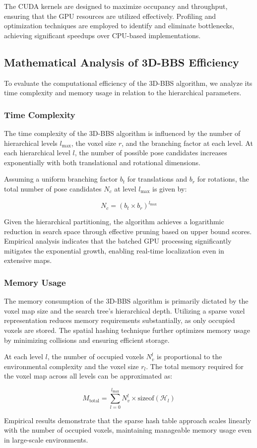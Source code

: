The CUDA kernels are designed to maximize occupancy and throughput, ensuring that the GPU resources are utilized effectively. Profiling and optimization techniques are employed to identify and eliminate bottlenecks, achieving significant speedups over CPU-based implementations.

\subsection{Mathematical Analysis of 3D-BBS Efficiency}
To evaluate the computational efficiency of the 3D-BBS algorithm, we analyze its time complexity and memory usage in relation to the hierarchical parameters.

\subsubsection{Time Complexity}
The time complexity of the 3D-BBS algorithm is influenced by the number of hierarchical levels $l_{\text{max}}$, the voxel size $r$, and the branching factor at each level. At each hierarchical level $l$, the number of possible pose candidates increases exponentially with both translational and rotational dimensions.

Assuming a uniform branching factor $b_t$ for translations and $b_r$ for rotations, the total number of pose candidates $N_c$ at level $l_{\text{max}}$ is given by:

$$N_c = (b_t \times b_r)^{l_{\text{max}}}$$

Given the hierarchical partitioning, the algorithm achieves a logarithmic reduction in search space through effective pruning based on upper bound scores. Empirical analysis indicates that the batched GPU processing significantly mitigates the exponential growth, enabling real-time localization even in extensive maps.

\subsubsection{Memory Usage}
The memory consumption of the 3D-BBS algorithm is primarily dictated by the voxel map size and the search tree's hierarchical depth. Utilizing a sparse voxel representation reduces memory requirements substantially, as only occupied voxels are stored. The spatial hashing technique further optimizes memory usage by minimizing collisions and ensuring efficient storage.

At each level $l$, the number of occupied voxels $N_v^l$ is proportional to the environmental complexity and the voxel size $r_l$. The total memory required for the voxel map across all levels can be approximated as:

$$M_{\text{total}} = \sum_{l=0}^{l_{\text{max}}} N_v^l \times \text{sizeof}(\mathcal{H}_l)$$

Empirical results demonstrate that the sparse hash table approach scales linearly with the number of occupied voxels, maintaining manageable memory usage even in large-scale environments.

